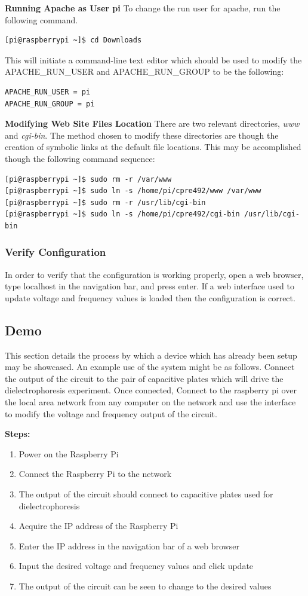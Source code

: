 \documentclass{article}	%
\begin{document}
\begin{multicols}{2}
\textbf{Running Apache as User pi}
To change the run user for apache,
run the following command.
\begin{lstlisting}
[pi@raspberrypi ~]$ cd Downloads
\end{lstlisting}
This will initiate a command-line
text editor which should be used to 
modify the APACHE\_RUN\_USER and APACHE\_RUN\_GROUP
to be the following:
\begin{lstlisting}
APACHE_RUN_USER = pi
APACHE_RUN_GROUP = pi
\end{lstlisting}

\textbf{Modifying Web Site Files Location}
There are two relevant directories,
\textit{www} and \textit{cgi-bin}.
The method chosen to modify these
directories are though the creation of
symbolic links at the default file locations.
This may be accomplished though the following command sequence:

\begin{lstlisting}
[pi@raspberrypi ~]$ sudo rm -r /var/www
[pi@raspberrypi ~]$ sudo ln -s /home/pi/cpre492/www /var/www 
[pi@raspberrypi ~]$ sudo rm -r /usr/lib/cgi-bin
[pi@raspberrypi ~]$ sudo ln -s /home/pi/cpre492/cgi-bin /usr/lib/cgi-bin 
\end{lstlisting}

\subsubsection{Verify Configuration}
In order to verify that the configuration
is working properly,
open a web browser,
type localhost in the navigation bar, and
press enter.
If a web interface used to update
voltage and frequency values is loaded then
the configuration is correct.

\subsection{Demo}
This section details the process
by which a device which has already
been setup may be showcased.
An example use of the system might be as follows.
Connect the output of the circuit to the pair
of capacitive plates which will drive 
the dielectrophoresis experiment.
Once connected,
Connect to the raspberry pi over
the local area network from
any computer on the network and
use the interface to modify the
voltage and frequency output of the circuit.

\textbf{Steps:}
\begin{enumerate}
\item{Power on the Raspberry Pi}
\item{Connect the Raspberry Pi to the network}
\item{The output of the circuit should connect to capacitive plates used for dielectrophoresis}
\item{Acquire the IP address of the Raspberry Pi}
\item{Enter the IP address in the navigation bar of a web browser}
\item{Input the desired voltage and frequency values and click update}
\item{The output of the circuit can be seen to change to the desired values}
\end{enumerate}


\end{multicols}
\end{document}
